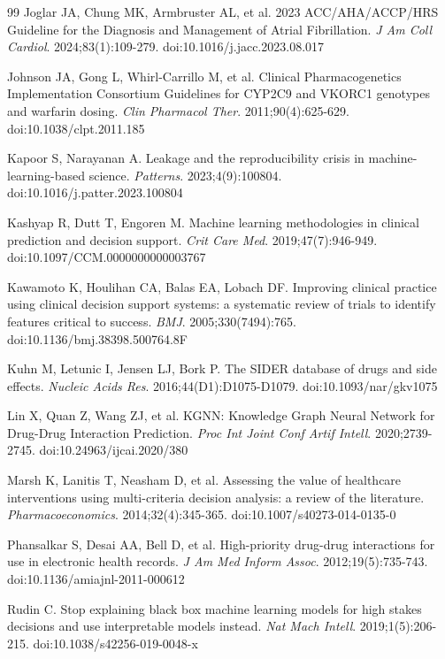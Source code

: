 \documentclass[11pt,a4paper]{article}
\begin{document}
\begin{thebibliography}{99}
Joglar JA, Chung MK, Armbruster AL, et al.
2023 ACC/AHA/ACCP/HRS Guideline for the Diagnosis and Management of Atrial Fibrillation.
\textit{J Am Coll Cardiol}. 2024;83(1):109-279. doi:10.1016/j.jacc.2023.08.017

Johnson JA, Gong L, Whirl-Carrillo M, et al.
Clinical Pharmacogenetics Implementation Consortium Guidelines for CYP2C9 and VKORC1 genotypes and warfarin dosing.
\textit{Clin Pharmacol Ther}. 2011;90(4):625-629. doi:10.1038/clpt.2011.185

Kapoor S, Narayanan A.
Leakage and the reproducibility crisis in machine-learning-based science.
\textit{Patterns}. 2023;4(9):100804. doi:10.1016/j.patter.2023.100804

Kashyap R, Dutt T, Engoren M.
Machine learning methodologies in clinical prediction and decision support.
\textit{Crit Care Med}. 2019;47(7):946-949. doi:10.1097/CCM.0000000000003767

Kawamoto K, Houlihan CA, Balas EA, Lobach DF.
Improving clinical practice using clinical decision support systems: a systematic review of trials to identify features critical to success.
\textit{BMJ}. 2005;330(7494):765. doi:10.1136/bmj.38398.500764.8F

Kuhn M, Letunic I, Jensen LJ, Bork P.
The SIDER database of drugs and side effects.
\textit{Nucleic Acids Res}. 2016;44(D1):D1075-D1079. doi:10.1093/nar/gkv1075

Lin X, Quan Z, Wang ZJ, et al.
KGNN: Knowledge Graph Neural Network for Drug-Drug Interaction Prediction.
\textit{Proc Int Joint Conf Artif Intell}. 2020;2739-2745. doi:10.24963/ijcai.2020/380

Marsh K, Lanitis T, Neasham D, et al.
Assessing the value of healthcare interventions using multi-criteria decision analysis: a review of the literature.
\textit{Pharmacoeconomics}. 2014;32(4):345-365. doi:10.1007/s40273-014-0135-0

Phansalkar S, Desai AA, Bell D, et al.
High-priority drug-drug interactions for use in electronic health records.
\textit{J Am Med Inform Assoc}. 2012;19(5):735-743. doi:10.1136/amiajnl-2011-000612

Rudin C.
Stop explaining black box machine learning models for high stakes decisions and use interpretable models instead.
\textit{Nat Mach Intell}. 2019;1(5):206-215. doi:10.1038/s42256-019-0048-x


\end{thebibliography}
\end{document}
